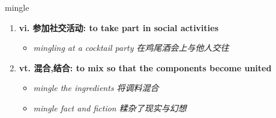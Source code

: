 
\begin{frame}
{\huge mingle}
\begin{center}
\begin{enumerate}\Large
  \item \textbf{vi. 参加社交活动: to take part in social activities}
  \begin{itemize}
    \item \em{\Large{mingling at a cocktail party 在鸡尾酒会上与他人交往}}
  \end{itemize}
  \item \textbf{vt. 混合,结合: to mix so that the components become united}
  \begin{itemize}
    \item \em{\Large{mingle the ingredients 将调料混合}}
    \item \em{\Large{mingle fact and fiction 糅杂了现实与幻想}}
  \end{itemize}
\end{enumerate}
\end{center}
\end{frame}
